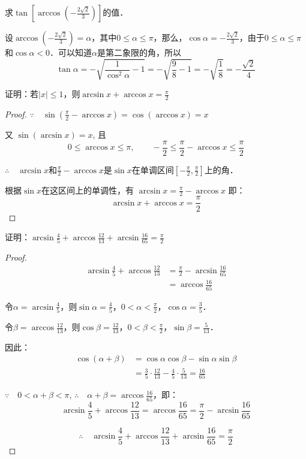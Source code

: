 \begin{example}
求$\tan\left[\arccos\left(-\frac{2\sqrt{2}}{3}\right)\right]$的值．
\end{example}

\begin{solution}
设$\arccos\left(-\frac{2\sqrt{2}}{3}\right)=\alpha$，其中$0\le \alpha\le \pi$，那么，$\cos\alpha=-\frac{2\sqrt{2}}{3}$，由于$0\le\alpha\le \pi$和$\cos\alpha<0$．可以知道$\alpha$是第二象限的角，所以
\[\tan\alpha=-\sqrt{\frac{1}{\cos^2\alpha}-1}=-\sqrt{\frac{9}{8}-1}=-\sqrt{\frac{1}{8}}=-\frac{\sqrt{2}}{4}\]
\end{solution}


\begin{example}
证明：若$|x|\le 1$，则$\arcsin x+\arccos x=\frac{\pi}{2}$

\end{example}

\begin{proof}
 $\because\quad    \sin\left(\frac{\pi}{2}-\arccos x\right)=\cos(\arccos x)=x$

    又    $\sin(\arcsin x)=x$, 且
  \[  0\le \arccos x\le \pi,\qquad -\frac{\pi}{2}\le \frac{\pi}{2}-\arccos x\le \frac{\pi}{2}\]

$\therefore\quad \arcsin x$和$\frac{\pi}{2}-\arccos x$是$\sin x$在单调区间$\left[-\frac{\pi}{2},\frac{\pi}{2}\right]$上的角．

根据$\sin x$在这区间上的单调性，有
$\arcsin x=\frac{\pi}{2}-\arccos x$
即：
\[\arcsin x+\arccos x=\frac{\pi}{2}\]
\end{proof}

\begin{example}
证明：$\arcsin\frac{4}{5}+\arccos\frac{12}{13}+\arcsin\frac{16}{65}=\frac{\pi}{2}$
\end{example}

\begin{proof}
\[\begin{split}
    \arcsin\frac{4}{5}+\arccos\frac{12}{13}&=\frac{\pi}{2}-\arcsin\frac{16}{65}\\
&=\arccos\frac{16}{65}
\end{split}\]
    
令$\alpha=\arcsin\frac{4}{5}$，则$\sin\alpha=\frac{4}{5}$，$0<\alpha<\frac{\pi}{2}$，$\cos\alpha=\frac{3}{5}$．

令$\beta=\arccos\frac{12}{13}$，则$\cos\beta=\frac{12}{13}$，$0<\beta<\frac{\pi}{2}$，$\sin\beta=\frac{5}{13}$．

因此：\[\begin{split}
    \cos(\alpha+\beta)&=\cos\alpha\cos\beta-\sin\alpha\sin\beta\\
    &=\frac{3}{5}\cdot \frac{12}{13}-\frac{4}{5}\cdot \frac{5}{13}=\frac{16}{65}
\end{split}\]

$\because\quad 0<\alpha+\beta<\pi$, $\therefore\quad \alpha+\beta=\arccos\frac{16}{65}$，即：
\[\arcsin\frac{4}{5}+\arccos\frac{12}{13}=\arccos\frac{16}{65}=\frac{\pi}{2}-\arcsin\frac{16}{65}\]

\[\therefore\quad \arcsin\frac{4}{5}+\arccos\frac{12}{13}+\arcsin\frac{16}{65}=\frac{\pi}{2}\]
\end{proof}

